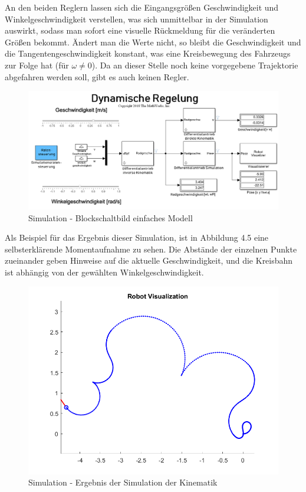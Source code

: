 An den beiden Reglern lassen sich die Eingangsgrößen Geschwindigkeit und Winkelgeschwindigkeit verstellen, was sich unmittelbar in der Simulation auswirkt, sodass man sofort eine visuelle Rückmeldung für die veränderten Größen bekommt. Ändert man die Werte nicht, so bleibt die Geschwindigkeit und die Tangentengeschwindigkeit konstant, was eine Kreisbewegung des Fahrzeugs zur Folge hat (für $\omega \not= 0$). Da an dieser Stelle noch keine vorgegebene Trajektorie abgefahren werden soll, gibt es auch keinen Regler.
\begin{figure}[htb]
  \centering  
  \includegraphics[scale=1.4]{img/simulation1.png}
  \caption{Simulation - Blockschaltbild einfaches Modell}
  \label{fig:starwars}
\end{figure}
Als Beispiel für das Ergebnis dieser Simulation, ist in Abbildung 4.5 eine selbsterklärende Momentaufnahme zu sehen. Die Abstände der einzelnen Punkte zueinander geben Hinweise auf die aktuelle Geschwindigkeit, und die Kreisbahn ist abhängig von der gewählten Winkelgeschwindigkeit. \\
\begin{figure}[H]
  \centering  
  \includegraphics[scale=0.7]{img/simulationsergebnis2.png}
  \caption{Simulation - Ergebnis der Simulation der Kinematik}
  \label{fig:starwars}
\end{figure}

